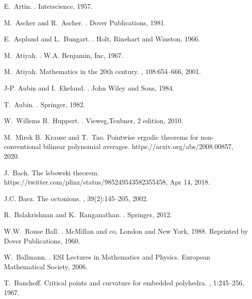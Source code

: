 \documentclass[12pt]{amsart}
\begin{document}
\begin{thebibliography}{100}
E.~Artin.
.
\newblock Interscience, 1957.

M.~Ascher and R.~Ascher.
.
\newblock Dover Publications, 1981.

E.~Asplund and L.~Bungart.
.
\newblock Holt, Rinehart and Winston, 1966.

M.~Atiyah.
.
\newblock W.A. Benjamin, Inc, 1967.

M.~Atiyah.
\newblock Mathematics in the 20th century.
, 108:654--666, 2001.

J-P. Aubin and I.~Ekeland.
.
\newblock John Wiley and Sons, 1984.

T.~Aubin.
.
\newblock Springer, 1982.

W.~Willems B.~Huppert.
.
\newblock Vieweg,Teubner, 2 edition, 2010.

M.~Mirek B.~Krause and T.~Tao.
\newblock Pointwise ergodic theorems for non-conventional bilinear polynomial
  averages.
\newblock https://arxiv.org/abs/2008.00857, 2020.

J.~Bach.
\newblock The lebowski theorem.
\newblock https://twitter.com/plinz/status/985249543582355458, Apr 14, 2018.

J.C. Baez.
\newblock The octonions.
, 39(2):145--205, 2002.

R.~Balakrishnan and K.~Ranganathan.
.
\newblock Springer, 2012.

W.W.~Rouse Ball.
.
\newblock McMillan and co, London and New York, 1988.
\newblock Reprinted by Dover Publications, 1960.

W.~Ballmann.
.
\newblock ESI Lectures in Mathematics and Physics. European Mathematical
  Society, 2006.

T.~Banchoff.
\newblock Critical points and curvature for embedded polyhedra.
, 1:245--256, 1967.


\end{thebibliography}
\end{document}
